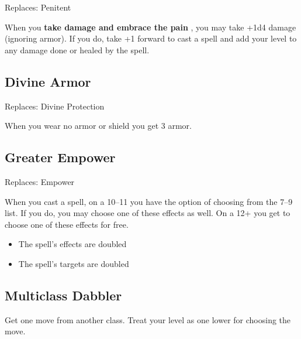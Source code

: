 Replaces: Penitent

When you \textbf{take damage and embrace the pain}
, you may take +1d4 damage (ignoring armor). If you do, take +1 forward to cast a spell and add your level to any damage done or healed by the spell.
\subsection{Divine Armor}

Replaces: Divine Protection

When you wear no armor or shield you get 3 armor.
\subsection{Greater Empower}

Replaces: Empower

When you cast a spell, on a 10--11 you have the option of choosing from the 7--9 list. If you do, you may choose one of these effects as well. On a 12+ you get to choose one of these effects for free.
\begin{itemize}
\item The spell's effects are doubled
\item The spell's targets are doubled

\end{itemize}
\subsection{Multiclass Dabbler}

Get one move from another class. Treat your level as one lower for choosing the move.


